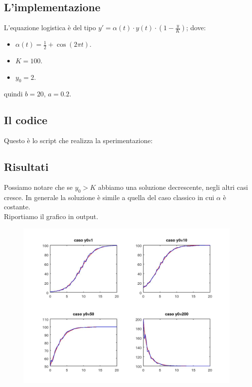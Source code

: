 \documentclass{article}
\begin{document}
	\subsection{L'implementazione}
	L'equazione logistica è del tipo $y'=\alpha(t) \cdot y(t) \cdot \left(1-\frac{y}{K}\right)$; dove:\\
	\begin{itemize}
		\item $\alpha(t)=\frac{1}{2}+\cos(2 \pi t)$.
		\item $K=100$.
		\item $y_0=2$.
	\end{itemize}
	quindi $b=20$, $a=0.2$.
	\subsection{Il codice}
	Questo è lo script che realizza la sperimentazione:
	
	\subsection{Risultati}
	Possiamo notare che se $y_0>K$ abbiamo una soluzione decrescente, negli altri casi cresce. In generale la soluzione è simile a quella del caso classico in cui $\alpha$ è costante.\\
	Riportiamo il grafico in output.
	\begin{figure}[htp!]
		\centering 
		\includegraphics[width=\textwidth]{3_4.jpeg}
	\end{figure}
	
\end{document}

